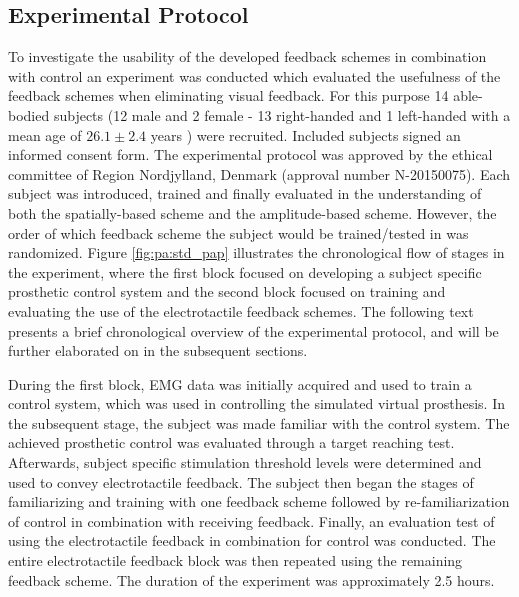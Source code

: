 \subsection{Experimental Protocol}

To investigate the usability of the developed feedback schemes in combination with control an experiment was conducted which evaluated the usefulness of the feedback schemes when eliminating visual feedback. For this purpose 14 able-bodied subjects (12 male and 2 female - 13 right-handed and 1 left-handed with a mean age of $26.1 \pm 2.4$ years ) were recruited. Included subjects signed an informed consent form. The experimental protocol was approved by the ethical committee of Region Nordjylland, Denmark (approval number N-20150075). Each subject was introduced, trained and finally evaluated in the understanding of both the spatially-based scheme and the amplitude-based scheme. However, the order of which feedback scheme the subject would be trained/tested in was randomized. Figure \ref{fig:pa:std_pap} illustrates the chronological flow of stages in the experiment, where the first block focused on developing a subject specific prosthetic control system and the second block focused on training and evaluating the use of the electrotactile feedback schemes. The following text presents a brief chronological overview of the experimental protocol, and will be further elaborated on in the subsequent sections.

During the first block, EMG data was initially acquired and used to train a control system, which was used in controlling the simulated virtual prosthesis. In the subsequent stage, the subject was made familiar with the control system. The achieved prosthetic control was evaluated through a target reaching test. Afterwards, subject specific stimulation threshold levels were determined and used to convey electrotactile feedback. The subject then began the stages of familiarizing and training with one feedback scheme followed by re-familiarization of control in combination with receiving feedback. Finally, an evaluation test of using the electrotactile feedback in combination for control was conducted. The entire electrotactile feedback block was then repeated using the remaining feedback scheme. The duration of the experiment was approximately 2.5 hours.  



